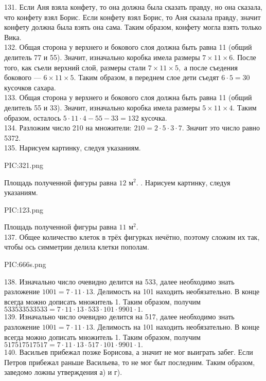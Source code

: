 131. Если Аня взяла конфету, то она должна была сказать правду, но она сказала, что конфету взял Борис. Если конфету взял Борис, то Аня сказала правду, значит конфету должна была взять она сама. Таким образом, конфету могла взять только Вика.\\
132. Общая сторона у верхнего и бокового слоя должна быть равна 11 (общий делитель 77 и 55). Значит, изначально коробка имела размеры $7\times11\times6.$ После того, как съели верхний слой, размеры стали $7\times11\times5,$ а после съедения бокового --- $6\times11\times5.$ Таким образом, в переднем слое дети съедят $6\cdot5=30$ кусочков сахара.\\
133. Общая сторона у верхнего и бокового слоя должна быть равна 11 (общий делитель 55 и 33). Значит, изначально коробка имела размеры $5\times11\times4.$ Таким образом, осталось $5\cdot11\cdot4-55-33=132$ кусочка.\\
134. Разложим число 210 на множители: $210=2\cdot5\cdot3\cdot7.$ Значит это число равно 5372.\\
135. Нарисуем картинку, следуя указаниям.
\begin{center}
{{PIC:321.png}}
\end{center}
Площадь полученной фигуры равна $12\text{ м}^2.$
\newpage{}. Нарисуем картинку, следуя указаниям.
\begin{center}
{{PIC:123.png}}
\end{center}
Площадь полученной фигуры равна $11\text{ м}^2.$\\
137. Общее количество клеток в трёх фигурках нечётно, поэтому сложим их так, чтобы ось симметрии делила клетки пополам.
\begin{center}
{{PIC:666s.png}}
\end{center}
138. Изначально число очевидно делится на 533, далее необходимо знать разложение $1001=7\cdot11\cdot13.$ Делимость на 101 находить необязательно. В конце всегда можно дописать множитель 1. Таким образом, получим $533533533533=7\cdot11\cdot13\cdot533\cdot101\cdot9901\cdot1.$\\
139. Изначально число очевидно делится на 517, далее необходимо знать разложение $1001=7\cdot11\cdot13.$ Делимость на 101 находить необязательно. В конце всегда можно дописать множитель 1. Таким образом, получим $517517517517=7\cdot11\cdot13\cdot517\cdot101\cdot9901\cdot1.$\\
140. Васильев прибежал позже Борисова, а значит не мог выиграть забег. Если Петров прибежал раньше Васильева, то не мог быт последним. Таким образом, заведомо ложны утверждения а) и г).\\
